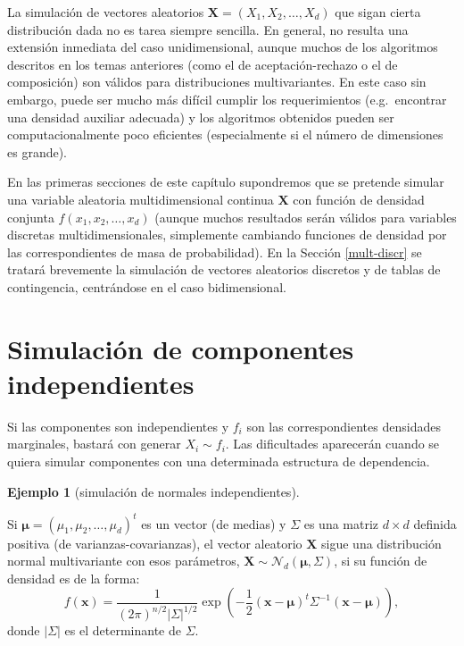 \documentclass[
]{book}
\theoremstyle{break}
\theoremstyle{definition}
\theoremstyle{definition}
\newtheorem{example}{Ejemplo}[chapter]
\theoremstyle{definition}
\theoremstyle{definition}
\theoremstyle{remark}
\begin{document}
La simulación de vectores aleatorios \(\mathbf{X} =\left( X_1,X_2,\ldots,X_d\right)\) que sigan cierta distribución dada no es tarea siempre sencilla.
En general, no resulta una extensión inmediata del caso unidimensional,
aunque muchos de los algoritmos descritos en los temas anteriores (como el de aceptación-rechazo o el de composición) son válidos para distribuciones multivariantes.
En este caso sin embargo, puede ser mucho más difícil cumplir los requerimientos (e.g.~encontrar una densidad auxiliar adecuada) y los algoritmos obtenidos pueden ser computacionalmente poco eficientes (especialmente si el número de dimensiones es grande).

En las primeras secciones de este capítulo supondremos que se pretende simular una variable aleatoria multidimensional continua \(\mathbf{X}\) con función de densidad conjunta \(f\left( x_1, x_2, \ldots , x_d\right)\) (aunque muchos resultados serán válidos para variables discretas multidimensionales, simplemente cambiando funciones de densidad por las correspondientes de masa de probabilidad).
En la Sección \ref{mult-discr} se tratará brevemente la simulación de vectores aleatorios discretos y de tablas de contingencia, centrándose en el caso bidimensional.

\hypertarget{simulaciuxf3n-de-componentes-independientes}{%
\section{Simulación de componentes independientes}\label{simulaciuxf3n-de-componentes-independientes}}

Si las componentes son independientes y \(f_i\) son las correspondientes densidades marginales, bastará con generar \(X_i \sim f_i\).
Las dificultades aparecerán cuando se quiera simular componentes con una determinada estructura de dependencia.

\begin{example}[simulación de normales independientes]
\protect\hypertarget{exm:normind}{}{\label{exm:normind} {} }
\end{example}

Si \(\boldsymbol\mu =\left( \mu_1,\mu_2,\ldots,\mu_d\right)^t\) es un vector (de medias) y
\(\Sigma\) es una matriz \(d \times d\) definida positiva (de varianzas-covarianzas), el vector aleatorio \(\mathbf{X}\) sigue una distribución normal multivariante con esos parámetros,
\(\mathbf{X} \sim \mathcal{N}_d\left( \boldsymbol\mu,\Sigma \right)\),
si su función de densidad es de la forma:
\[f(\mathbf x) = \frac{1}{(2\pi)^{n/2}|\Sigma|^{1/2}}
\exp \left( -\frac{1}{2} ( \mathbf x - \boldsymbol \mu)^t \Sigma^{-1} (\mathbf x - \boldsymbol \mu)
\right),\]
donde \(| \Sigma |\) es el determinante de \(\Sigma\).
\end{document}
